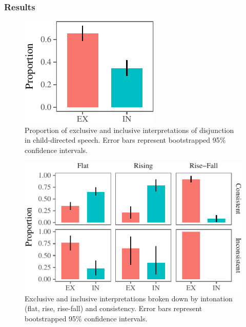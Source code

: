 \documentclass[oneside]{report}
\theoremstyle{definition}
\theoremstyle{definition}
\theoremstyle{definition}
\theoremstyle{remark}
\begin{document}
\subsubsection{Results}\label{results-4}
\begin{figure}[b]

{\centering \includegraphics{figs/interpretation-1} 

}

\caption{Proportion of exclusive and inclusive interpretations of disjunction in child-directed speech. Error bars represent bootstrapped 95\% confidence intervals.}\label{fig:interpretation}
\end{figure}
\begin{figure}[t]

{\centering \includegraphics{figs/interpretationByIntonationAndConsistency-1} 

}

\caption{Exclusive and inclusive interpretations broken down by intonation (flat, rise, rise-fall) and consistency. Error bars represent bootstrapped 95\% confidence intervals.}\label{fig:interpretationByIntonationAndConsistency}
\end{figure}
\end{document}
